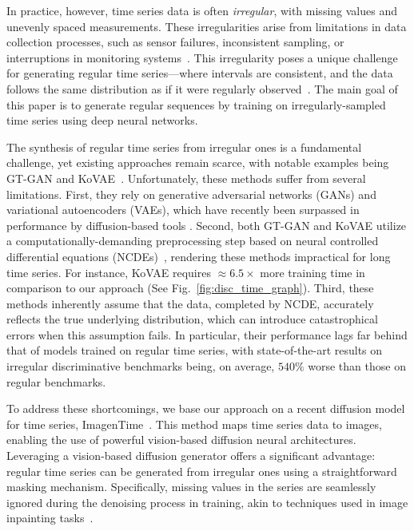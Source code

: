 \documentclass{article}
\theoremstyle{plain}
\theoremstyle{definition}
\theoremstyle{remark}
\begin{document}
In practice, however, time series data is often \emph{irregular}, with missing values and unevenly spaced measurements. These irregularities arise from limitations in data collection processes, such as sensor failures, inconsistent sampling, or interruptions in monitoring systems~\cite{kidger2020neural}. This irregularity poses a unique challenge for generating regular time series---where intervals are consistent, and the data follows the same distribution as if it were regularly observed~\cite{jeon2022gt}. The main goal of this paper is to generate regular sequences by training on irregularly-sampled time series using deep neural networks. 


The synthesis of regular time series from irregular ones is a fundamental challenge, yet existing approaches remain scarce, with notable examples being GT-GAN and KoVAE~\cite{jeon2022gt, naiman2024generative}. Unfortunately, these methods suffer from several limitations. First, they rely on generative adversarial networks (GANs) and variational autoencoders (VAEs), which have recently been surpassed in performance by diffusion-based tools \cite{coletta2023constrained, yuan2024diffusion, naiman2024utilizing}. Second, both GT-GAN and KoVAE utilize a computationally-demanding preprocessing step based on neural controlled differential equations (NCDEs)~\cite{kidger2020neural}, rendering these methods impractical for long time series. For instance, KoVAE requires $\approx 6.5 \times$ more training time in comparison to our approach (See Fig.~\ref{fig:disc_time_graph}). Third, these methods inherently assume that the data, completed by NCDE, accurately reflects the true underlying distribution, which can introduce catastrophical errors when this assumption fails. In particular, their performance lags far behind that of models trained on regular time series, with state-of-the-art results on irregular discriminative benchmarks being, on average, $540\%$ worse than those on regular benchmarks.


To address these shortcomings, we base our approach on a recent diffusion model for time series, ImagenTime~\cite{naiman2024utilizing}. This method maps time series data to images, enabling the use of powerful vision-based diffusion neural architectures. Leveraging a vision-based diffusion generator offers a significant advantage: regular time series can be generated from irregular ones using a straightforward masking mechanism. Specifically, missing values in the series are seamlessly ignored during the denoising process in training, akin to techniques used in image inpainting tasks~\cite{lugmayr2022repaint, corneanu2024latentpaint}.
\end{document}
